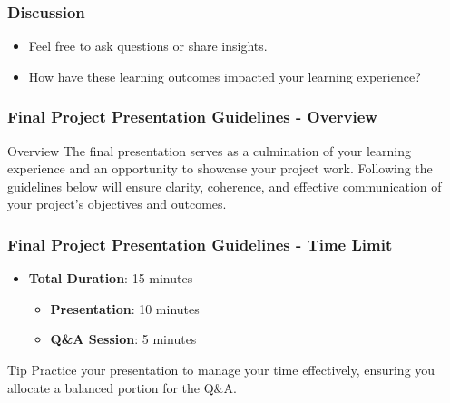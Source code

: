 \documentclass[aspectratio=169]{beamer}
\begin{document}
\begin{frame}[fragile]
    \frametitle{Discussion}
    \begin{itemize}
        \item Feel free to ask questions or share insights.
        \item How have these learning outcomes impacted your learning experience?
    \end{itemize}
\end{frame}

\begin{frame}[fragile]
    \frametitle{Final Project Presentation Guidelines - Overview}
    \begin{block}{Overview}
        The final presentation serves as a culmination of your learning experience and an opportunity to showcase your project work. 
        Following the guidelines below will ensure clarity, coherence, and effective communication of your project’s objectives and outcomes.
    \end{block}
\end{frame}

\begin{frame}[fragile]
    \frametitle{Final Project Presentation Guidelines - Time Limit}
    \begin{itemize}
        \item \textbf{Total Duration}: 15 minutes
        \begin{itemize}
            \item \textbf{Presentation}: 10 minutes
            \item \textbf{Q\&A Session}: 5 minutes
        \end{itemize}
    \end{itemize}
    \begin{block}{Tip}
        Practice your presentation to manage your time effectively, ensuring you allocate a balanced portion for the Q\&A.
    \end{block}
\end{frame}
\end{document}
